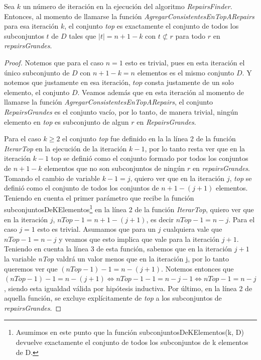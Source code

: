 \documentclass[11pt,a4paper,twoside]{tesis}
\begin{document}
\begin{lemma}\label{tamano_top_2}
Sea $k$ un número de iteración en la ejecución del algoritmo \textit{RepairsFinder}. Entonces, al momento de llamarse la función \textit{AgregarConsistentesEnTopARepairs} para esa iteración $k$, el conjunto \textit{top} es exactamente el conjunto de todos los subconjuntos $t$ de $D$ tales que $|t| = n + 1 - k$ con $t \not\subset r$ para todo $r$ en \textit{repairsGrandes}.
\end{lemma}

\begin{proof}
Notemos que para el caso $n=1$ esto es trivial, pues en esta iteración el único subconjunto de $D$ con $n + 1 - k = n$ elementos es el mismo conjunto $D$. Y notemos que justamente en esa iteración, $top$ consta justamente de un solo elemento, el conjunto $D$. Veamos además que en esta iteración al momento de llamarse la función \textit{AgregarConsistentesEnTopARepairs}, el conjunto \textit{RepairsGrandes} es el conjunto vacío, por lo tanto, de manera trivial, ningún elemento en \textit{top} es subconjunto de algun $r$ en \textit{RepairsGrandes}.

Para el caso $k \geq 2$ el conjunto \textit{top} fue definido en la la línea 2 de la función \textit{IterarTop} en la ejecución de la iteración $k-1$, por lo tanto resta ver que en la iteración $k-1$ top se definió como el conjunto formado por todos los conjuntos de $n + 1 - k$ elementos que no son subconjuntos de ningún $r$ en \textit{repairsGrandes}. Tomando el cambio de variable $k - 1 = j$, quiero ver que en la iteración $j$, \textit{top} se definió como el conjunto de  todos los conjuntos de $n + 1 - (j + 1)$ elementos. Teniendo en cuenta el primer parámetro que recibe la función subconjuntosDeKElementos\footnote{Asumimos en este punto que la función subconjuntosDeKElementos(k, D) devuelve exactamente el conjunto de todos los subconjuntos de k elementos de D.} en la línea 2 de la función \textit{IterarTop}, quiero ver que en la iteración $j$, $nTop-1=n + 1 - (j + 1)$, es decir $nTop-1=n-j$. Para el caso $j=1$ esto es trivial. Asumamos que para un $j$ cualquiera vale que $nTop-1=n-j$ y veamos que esto implica que vale para la iteración $j+1$. Teniendo en cuenta la línea 3 de esta función, sabemos que en la iteración $j+1$ la variable \textit{nTop} valdrá un valor menos que en la iteración j, por lo tanto queremos ver que $(nTop-1) - 1 = n - (j+1)$. Notemos entonces que $(nTop-1) - 1 = n - (j+1) \iff nTop-1 - 1 = n - j -1 \iff nTop-1 = n - j$, siendo esta igualdad válida por hipótesis inductiva.
Por último, en la línea 2 de aquella función, se excluye explícitamente de \textit{top} a los subconjuntos de \textit{repairsGrandes}.
\end{proof}
\end{document}
